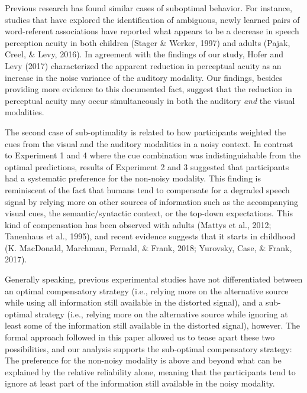 \documentclass[english,,man,floatsintext]{apa6}
\theoremstyle{definition}
\theoremstyle{definition}
\theoremstyle{definition}
\theoremstyle{remark}
\begin{document}
Previous research has found similar cases of suboptimal behavior. For
instance, studies that have explored the identification of ambiguous,
newly learned pairs of word-referent associations have reported what
appears to be a decrease in speech perception acuity in both children
(Stager \& Werker, 1997) and adults (Pajak, Creel, \& Levy, 2016). In
agreement with the findings of our study, Hofer and Levy (2017)
characterized the apparent reduction in perceptual acuity as an increase
in the noise variance of the auditory modality. Our findings, besides
providing more evidence to this documented fact, suggest that the
reduction in perceptual acuity may occur simultaneously in both the
auditory \emph{and} the visual modalities.

The second case of sub-optimality is related to how participants
weighted the cues from the visual and the auditory modalities in a noisy
context. In contrast to Experiment 1 and 4 where the cue combination was
indistinguishable from the optimal predictions, results of Experiment 2
and 3 suggested that participants had a systematic preference for the
non-noisy modality. This finding is reminiscent of the fact that humans
tend to compensate for a degraded speech signal by relying more on other
sources of information such as the accompanying visual cues, the
semantic/syntactic context, or the top-down expectations. This kind of
compensation has been observed with adults (Mattys et al., 2012;
Tanenhaus et al., 1995), and recent evidence suggests that it starts in
childhood (K. MacDonald, Marchman, Fernald, \& Frank, 2018; Yurovsky,
Case, \& Frank, 2017).

Generally speaking, previous experimental studies have not
differentiated between an optimal compensatory strategy (i.e., relying
more on the alternative source while using all information still
available in the distorted signal), and a sub-optimal strategy (i.e.,
relying more on the alternative source while ignoring at least some of
the information still available in the distorted signal), however. The
formal approach followed in this paper allowed us to tease apart these
two possibilities, and our analysis supports the sub-optimal
compensatory strategy: The preference for the non-noisy modality is
above and beyond what can be explained by the relative reliability
alone, meaning that the participants tend to ignore at least part of the
information still available in the noisy modality.
\end{document}
